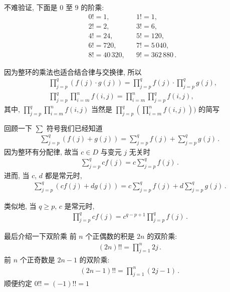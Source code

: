 \begin{example}
    不难验证, 下面是 $0$ 至 $9$ 的阶乘:
    \begin{align*}
         & 0! = 1,       &  & 1! = 1,               \\
         & 2! = 2,       &  & 3! = 6,               \\
         & 4! = 24,      &  & 5! = 120,             \\
         & 6! = 720,     &  & 7! = 5\,040,          \\
         & 8! = 40\,320, &  & 9! = 362\,880 \period
    \end{align*}
\end{example}

\begin{remark}
    因为整环的乘法也适合结合律与交换律, 所以
    \begin{align*}
         & \prod_{j=p}^{q} (f(j) \cdot g(j)) = \prod_{j=p}^{q} f(j) \cdot \prod_{j=p}^{q} g(j), \\
         & \prod_{j=p}^{q} \prod_{i=m}^{n} f(i,j) = \prod_{i=m}^{n} \prod_{j=p}^{q} f(i,j),
    \end{align*}
    其中, $\prod_{j=p}^{q} \prod_{i=m}^{n} f(i,j)$ 当然是 $\prod_{j=p}^{q} \left( \prod_{i=m}^{n} f(i,j) \right))$ 的简写\period
\end{remark}

\begin{remark}
    回顾一下 $\sum$ 符号\period 我们已经知道
    \begin{align*}
        \sum_{j=p}^{q} (f(j) + g(j)) = \sum_{j=p}^{q} f(j) + \sum_{j=p}^{q} g(j) \period
    \end{align*}
    因为整环有分配律, 故当 $c \in D$ 与变元 $j$ 无关时
    \begin{align*}
        \sum_{j=p}^{q} cf(j) = c\sum_{j=p}^{q} f(j) \period
    \end{align*}
    进而, 当 $c$, $d$ 都是常元时,
    \begin{align*}
        \sum_{j=p}^{q} (cf(j) + dg(j)) = c\sum_{j=p}^{q} f(j) + d\sum_{j=p}^{q} g(j) \period
    \end{align*}

    类似地, 当 $q \geq p$, $c$ 是常元时,
    \begin{align*}
        \prod_{j=p}^{q} cf(j) = c^{q-p+1} \prod_{j=p}^{q} f(j) \period
    \end{align*}
\end{remark}

\begin{definition}
    最后介绍一下双阶乘 \period 前 $n$ 个正偶数的积是 $2n$ 的双阶乘:
    \begin{align*}
        (2n)!! = \prod_{j=1}^{n} {2j} \period
    \end{align*}
    前 $n$ 个正奇数是 $2n-1$ 的双阶乘:
    \begin{align*}
        (2n-1)!! = \prod_{j=1}^{n} {(2j-1)} \period
    \end{align*}
    顺便约定 $0!! = (-1)!! = 1$\period
\end{definition}

